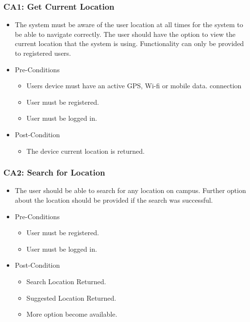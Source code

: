 \documentclass[12pt,a4paper]{article}
\begin{document}
		\subsubsection{CA1: Get Current Location}
			\begin{itemize}
				\item The system must be aware of the user location at all times for the system to be able to navigate correctly. The user should have the option to view the current location that the system is using. Functionality can only be provided to registered users.
				\item Pre-Conditions
					\begin{itemize}
						\item Users device must have an active GPS, Wi-fi or mobile data. connection
						\item User must be registered.
						\item User must be logged in.
					\end{itemize}
				\item Post-Condition
					\begin{itemize}
						\item The device current location is returned.
					\end{itemize}
			\end{itemize}
		\subsubsection{CA2: Search for Location}
			\begin{itemize}
				\item The user should be able to search for any location on campus. Further option about the location should be provided if the search was successful.
				\item Pre-Conditions
					\begin{itemize}
						\item User must be registered.
						\item User must be logged in.
					\end{itemize}
				\item Post-Condition
					\begin{itemize}
						\item Search Location Returned.
						\item Suggested Location Returned.
						\item More option become available.
					\end{itemize}
			\end{itemize}
\end{document}

